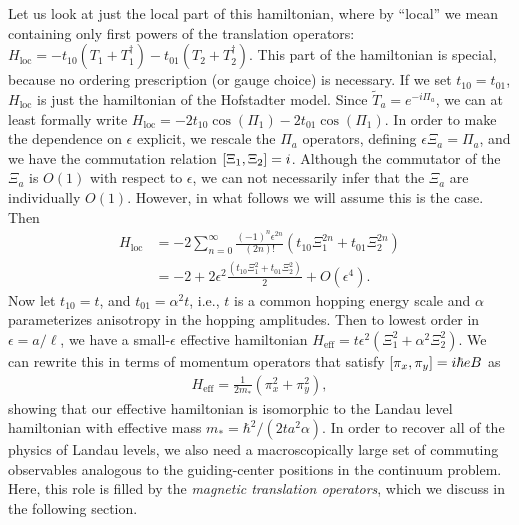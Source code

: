 \documentclass[aps,prb,twocolumn,letterpaper,twoside,nobalancelastpage,groupedaddress,amsmath,amssymb,floatfix,citeautoscript]{revtex4-1}
\begin{document}
Let us look at just the local part of this hamiltonian, where by ``local'' we mean containing only first powers of the translation operators: $H_{\text{loc}} = -t_{10}\left(T_1 + T_1^{\dag}\right) - t_{01}\left(T_2 + T_2^{\dag}\right)$. This part of the hamiltonian is special, because no ordering prescription (or gauge choice) is necessary.   If we set $t_{10} = t_{01}$, $H_{\text{loc}}$ is just the hamiltonian of the Hofstadter model. Since $\widetilde{T}_a = e^{-i\Pi_a}$, we can at least formally write $H_{\text{loc}}= -2t_{10}\cos\left(\Pi_1\right) - 2 t_{01}\cos\left(\Pi_1\right).$ In order to make the dependence on $\epsilon$ explicit, we rescale the $\Pi_a$ operators, defining $\epsilon\Xi_a = \Pi_a$, and we have the commutation relation $\comm{\Xi_1}{\Xi_2} = i$. Although the commutator of the $\Xi_a$ is $O(1)$ with respect to $\epsilon$, we can not necessarily infer that the $\Xi_a$ are individually $O(1)$. However, in what follows we will assume this is the case. Then
\begin{align*}
H_{\text{loc}} &= -2\sum_{n=0}^{\infty}  \frac{(-1)^{n}\epsilon^{2n}}{(2n)!} \left(t_{10}\Xi^{2n}_1 + t_{01} \Xi^{2n}_2\right)\\
&= -2 + 2\epsilon^2\frac{\left(t_{10}\Xi^{2}_1 + t_{01}\Xi^{2}_2\right)}{2} +O(\epsilon^4).
\end{align*}
Now let $t_{10} = t$, and $t_{01} = \alpha^2 t$, i.e., $t$ is a common hopping energy scale and $\alpha$ parameterizes anisotropy in the hopping amplitudes. Then to lowest order in $\epsilon = a/\ell$, we have a small-$\epsilon$ effective hamiltonian $H_{\text{eff}}= t\epsilon^2 \left(\Xi^{2}_1 + \alpha^2\Xi^{2}_2\right)$. We can rewrite this in terms of momentum operators that satisfy $\comm{\pi_x}{\pi_y} = i\hbar e B$ as
\begin{align*}
H_{\text{eff}} = \frac{1}{2m_{\ast}}\left(\pi_x^2 + \pi_y^2\right),
\end{align*}
showing that our effective hamiltonian is isomorphic to the Landau level hamiltonian with effective mass $m_{\ast} = \hbar^2/(2ta^2\alpha)$. In order to recover all of the physics of Landau levels, we also need a macroscopically large set of commuting observables analogous to the guiding-center positions in the continuum problem.
Here, this role is filled by the \textit{magnetic translation operators}, which we discuss in the following section.
\end{document}
